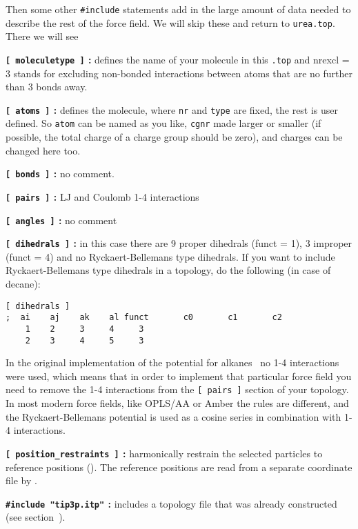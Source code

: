 Then some other {\tt \#include} statements add in the large amount of data needed
to describe the rest of the force field. We will skip these and return to {\tt urea.top}.
There we will see

%

{\bf {\tt [~moleculetype~]} :} defines the name of your molecule in
this {\tt *.top} and nrexcl = 3 stands for excluding non-bonded
interactions between atoms that are no further than 3 bonds away.

{\bf {\tt [~atoms~]} :} defines the molecule, where {\tt nr} and
{\tt type} are fixed, the rest is user defined. So {\tt atom} can be named
as you like, {\tt cgnr} made larger or smaller (if possible, the total
charge of a charge group should be zero), and charges can be changed
here too.

{\bf {\tt [~bonds~]} :} no comment.

{\bf {\tt [~pairs~]} :} LJ and Coulomb 1-4 interactions

{\bf {\tt [~angles~]} :} no comment

{\bf {\tt [~dihedrals~]} :} in this case there are 9 proper dihedrals
(funct = 1), 3 improper (funct = 4) and no Ryckaert-Bellemans type
dihedrals. If you want to include Ryckaert-Bellemans type dihedrals
in a topology, do the following (in case of {\eg} decane):
\begin{verbatim}
[ dihedrals ]
;  ai    aj    ak    al funct       c0       c1       c2
    1    2     3     4     3 
    2    3     4     5     3
\end{verbatim}
In the original implementation of the potential for
alkanes~\cite{Ryckaert78} no 1-4 interactions were used, which means
that in order to implement that particular force field you need to remove the 1-4
interactions from the {\tt [~pairs~]} section of your topology. In
most modern force fields, like OPLS/AA or Amber the rules are
different, and the Ryckaert-Bellemans potential is used as a cosine
series in combination with 1-4 interactions.

{\bf {\tt [~position_restraints~]} :} harmonically restrain the selected particles
to reference positions (). 
The reference positions are read from a 
separate coordinate file by {\tt {}}.

{\bf {\tt \#include "tip3p.itp"} :} includes a topology file that was already
constructed (see section~).

